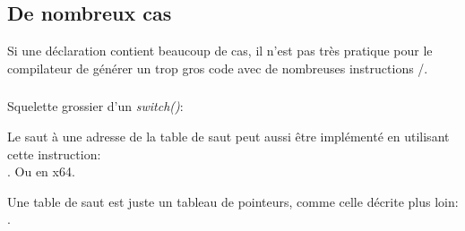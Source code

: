 \subsection{De nombreux cas}

Si une déclaration  contient beaucoup de cas, il n'est pas très pratique
pour le compilateur de générer un trop gros code avec de nombreuses instructions
\JE/\JNE.







\subsubsection{\Conclusion{}}

Squelette grossier d'un \emph{switch()}:



Le saut à une adresse de la table de saut peut aussi être implémenté en utilisant
cette instruction: \\
.
Ou  en x64.

Une table de saut est juste un tableau de pointeurs, comme celle décrite plus
loin: . 
